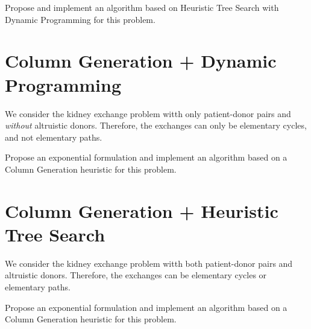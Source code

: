 \documentclass[a4paper]{article}
\begin{document}
Propose and implement an algorithm based on Heuristic Tree Search with Dynamic Programming for this problem.

\section{Column Generation + Dynamic Programming}

We consider the kidney exchange problem witth only patient-donor pairs and \emph{without} altruistic donors. Therefore, the exchanges can only be elementary cycles, and not elementary paths.

Propose an exponential formulation and implement an algorithm based on a Column Generation heuristic for this problem.

\section{Column Generation + Heuristic Tree Search}

We consider the kidney exchange problem witth both patient-donor pairs and altruistic donors. Therefore, the exchanges can be elementary cycles or elementary paths.

Propose an exponential formulation and implement an algorithm based on a Column Generation heuristic for this problem.

\printbibliography%
\end{document}
